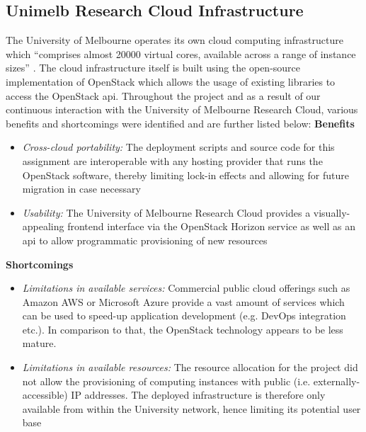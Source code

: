 \documentclass[11pt, oneside]{article}
\newenvironment{myitemize}
{ \begin{itemize}
    \setlength{\itemsep}{1pt}
    \setlength{\parskip}{1pt}
    \setlength{\parsep}{1pt}     }
{ \end{itemize}                  }
\begin{document}
\subsection{Unimelb Research Cloud Infrastructure}
The University of Melbourne operates its own cloud computing infrastructure which \enquote{comprises almost 20000 virtual cores, available across a range of instance sizes} \citep{unimelb_research_cloud}. The cloud infrastructure itself is built using the open-source implementation of OpenStack \citep{openstack} which allows the usage of existing libraries to access the OpenStack \acrfull{api}. 
\newline
Throughout the project and as a result of our continuous interaction with the University of Melbourne Research Cloud, various benefits and shortcomings were identified and are further listed below: 
\newline
\newline
\textbf{Benefits}
\begin{myitemize}
    \item \textit{Cross-cloud portability:} The deployment scripts and source code for this assignment are interoperable with any hosting provider that runs the OpenStack software, thereby limiting lock-in effects and allowing for future migration in case necessary 
    \item \textit{Usability:} The University of Melbourne Research Cloud provides a visually-appealing frontend interface via the OpenStack Horizon service as well as an \acrshort{api} to allow programmatic provisioning of new resources
\end{myitemize}

\textbf{Shortcomings}
\begin{myitemize}
    \item \textit{Limitations in available services:} Commercial public cloud offerings such as Amazon AWS or Microsoft Azure provide a vast amount of services which can be used to speed-up application development (e.g. DevOps integration etc.). In comparison to that, the OpenStack technology appears to be less mature.
    \item \textit{Limitations in available resources:} The resource allocation for the project did not allow the provisioning of computing instances with public (i.e. externally-accessible) IP addresses. The deployed infrastructure is therefore only available from within the University network, hence limiting its potential user base
\end{myitemize}
\end{document}
